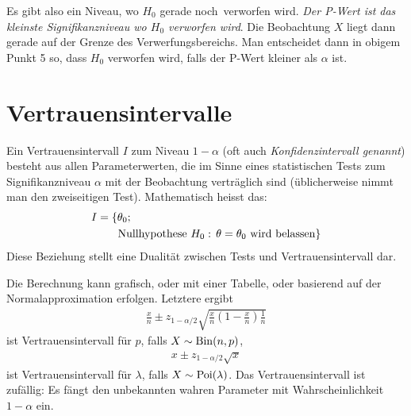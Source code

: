 Es gibt also ein Niveau, wo $H_0$ \glqq gerade noch\grqq \ verworfen wird. \emph{Der P-Wert ist das kleinste Signifikanzniveau wo $H_0$ verworfen wird}. Die Beobachtung $X$ liegt dann gerade auf der Grenze des Verwerfungsbereichs. Man entscheidet dann in obigem Punkt 5 so, dass $H_0$ verworfen wird, falls der P-Wert kleiner als $\alpha$ ist.
\section{Vertrauensintervalle}
Ein Vertrauensintervall $I$ zum Niveau $1-\alpha$ (oft auch \emph{Konfidenzintervall genannt}) besteht aus allen Parameterwerten, die im Sinne eines statistischen Tests zum Signifikanzniveau $\alpha$ mit der Beobachtung verträglich sind (üblicherweise nimmt man den zweiseitigen Test). Mathematisch heisst das:
\begin{align*}
	I&=\{ \theta_0;\\
		&\hphantom{=\{}\text{ Nullhypothese }H_0:\, \theta=\theta_0\text{ wird belassen} \}
\end{align*}
Diese Beziehung stellt eine Dualität zwischen Tests und Vertrauensintervall dar. 

Die Berechnung kann grafisch, oder mit einer Tabelle, oder basierend auf der Normalapproximation erfolgen. Letztere ergibt
\begin{gather*}
	\frac{x}{n}\pm z_{1-\alpha/2}\sqrt{\frac{x}{n}\left( 1-\frac{x}{n} \right)\frac{1}{n}}
\end{gather*}
ist Vertrauensintervall für $p$, falls $X\sim \operatorname{Bin}(n,p)$,
\begin{gather*}
	x\pm z_{1-\alpha/2}\sqrt{x}
\end{gather*}
ist Vertrauensintervall für $\lambda$, falls $X\sim \operatorname{Poi}(\lambda)$.
Das Vertrauensintervall ist zufällig: Es fängt den unbekannten wahren Parameter mit Wahrscheinlichkeit $1-\alpha$ ein.
